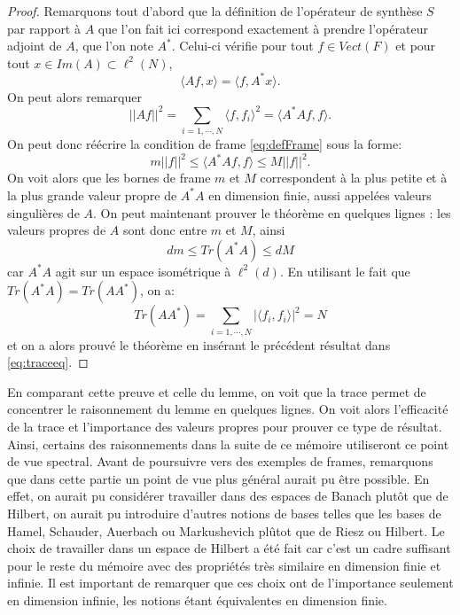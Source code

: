 	\begin{proof}
		Remarquons tout d'abord que la définition de l'opérateur de synthèse $S$ par rapport à $A$ que l'on fait ici correspond exactement à prendre l'opérateur adjoint de $A$, que l'on note $A^*$.
		Celui-ci vérifie pour tout $f\in Vect(F)$ et pour tout $x\in Im(A) \subset \ell^2(N)$,
		\begin{equation}
			\langle Af, x \rangle = \langle f, A^*x \rangle.
		\end{equation}
		On peut alors remarquer
		\begin{equation}
			||Af||^2 = \sum_{i=1, \cdots,N} \langle f, f_i \rangle^2 = \langle A^*Af, f\rangle.
		\end{equation}
		On peut donc réécrire la condition de frame \ref{eq:defFrame} sous la forme:
		\begin{equation}
			m||f||^2 \leq \langle A^*Af, f\rangle \leq M||f||^2.
		\end{equation}
		On voit alors que les bornes de frame $m$ et $M$ correspondent à la plus petite et à la plus grande valeur propre de $A^*A$ en dimension finie, aussi appelées valeurs singulières de $A$.
		\newline
		On peut maintenant prouver le théorème en quelques lignes : les valeurs propres de $A$ sont donc entre $m$ et $M$, ainsi
		\begin{equation}\label{eq:traceeq}
			dm \leq Tr(A^*A) \leq dM
		\end{equation}
		car $A^*A$ agit sur un espace isométrique à $\ell^2(d)$.
		En utilisant le fait que $Tr(A^*A) = Tr(AA^*)$, on a:
		\begin{equation}
			Tr(AA^*) = \sum_{i=1,\cdots, N} |\langle f_i, f_i \rangle|^2 = N
		\end{equation}
		et on a alors prouvé le théorème en insérant le précédent résultat dans \ref{eq:traceeq}.  	
	\end{proof}	
	En comparant cette preuve et celle du lemme, on voit que la trace permet de concentrer le raisonnement du lemme en quelques lignes.
	On voit alors l'efficacité de la trace et l'importance des valeurs propres pour prouver ce type de résultat.
	Ainsi, certains des raisonnements dans la suite de ce mémoire utiliseront ce point de vue spectral.
	\newline
	Avant de poursuivre vers des exemples de frames, remarquons que dans cette partie un point de vue plus général aurait pu être possible.
	En effet, on aurait pu considérer travailler dans des espaces de Banach plutôt que de Hilbert, on aurait pu introduire d'autres notions de bases telles que les bases de Hamel, Schauder, Auerbach ou Markushevich plûtot que de Riesz ou Hilbert.
	Le choix de travailler dans un espace de Hilbert a été fait car c'est un cadre suffisant pour le reste du mémoire avec des propriétés très similaire en dimension finie et infinie.
	Il est important de remarquer que ces choix ont de l'importance seulement en dimension infinie, les notions étant équivalentes en dimension finie.


